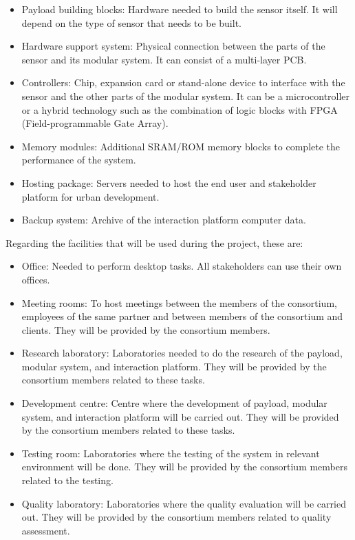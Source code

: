 \begin{itemize}
\item Payload building blocks: Hardware needed to build the sensor itself. It will depend on the type of sensor that needs to be built.
\item Hardware support system: Physical connection between the parts of the sensor and its modular system. It can consist of a multi-layer PCB.
\item Controllers: Chip, expansion card or stand-alone device to interface with the sensor and the other parts of the modular system. It can be a microcontroller or a hybrid technology such as the combination of logic blocks with FPGA (Field-programmable Gate Array).
\item Memory modules: Additional SRAM/ROM memory blocks to complete the performance of the system.
\item Hosting package: Servers needed to host the end user and stakeholder platform for urban development.
\item Backup system: Archive of the interaction platform computer data. 
\end{itemize}

Regarding the facilities that will be used during the project, these are:

\begin{itemize}
\item Office: Needed to perform desktop tasks. All stakeholders can use their own offices.
\item Meeting rooms: To host meetings between the members of the consortium, employees of the same partner and between members of the consortium and clients. They will be provided by the consortium members. 
\item Research laboratory: Laboratories needed to do the research of the payload, modular system, and interaction platform. They will be provided by the consortium members related to these tasks. 
\item Development centre: Centre where the development of payload, modular system, and interaction platform will be carried out. They will be provided by the consortium members related to these tasks.
\item Testing room: Laboratories where the testing of the system in relevant environment will be done. They will be provided by the consortium members related to the testing.
\item Quality laboratory: Laboratories where the quality evaluation will be carried out. They will be provided by the consortium members related to quality assessment. 
\end{itemize}

